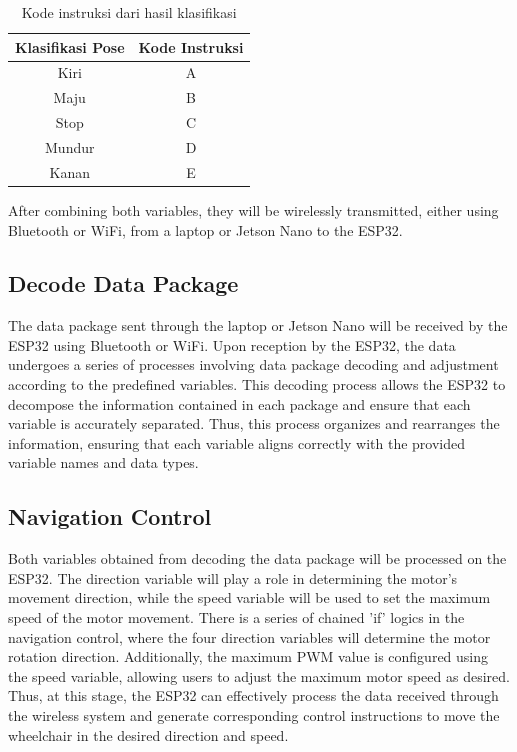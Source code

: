 \begin{table}[h]
  \centering
      \caption{Kode instruksi dari hasil klasifikasi}
      \label{tbl:kode-instruksi}
      \begin{tabular}{|c|c|}
          \hline
          Klasifikasi Pose & Kode Instruksi \\ \hline
          Kiri             & A              \\ \hline
          Maju             & B              \\ \hline
          Stop             & C              \\ \hline
          Mundur           & D              \\ \hline
          Kanan            & E              \\ \hline
      \end{tabular}
\end{table}

After combining both variables, they will be wirelessly transmitted, either using Bluetooth or WiFi, from a laptop or Jetson Nano to the ESP32.

\subsection{Decode Data Package}
The data package sent through the laptop or Jetson Nano will be received by the ESP32 using Bluetooth or WiFi. Upon reception by the ESP32, the data undergoes a series of processes involving data package decoding and adjustment according to the predefined variables. This decoding process allows the ESP32 to decompose the information contained in each package and ensure that each variable is accurately separated. Thus, this process organizes and rearranges the information, ensuring that each variable aligns correctly with the provided variable names and data types.

\subsection{Navigation Control}
Both variables obtained from decoding the data package will be processed on the ESP32. The direction variable will play a role in determining the motor's movement direction, while the speed variable will be used to set the maximum speed of the motor movement. There is a series of chained 'if' logics in the navigation control, where the four direction variables will determine the motor rotation direction. Additionally, the maximum PWM value is configured using the speed variable, allowing users to adjust the maximum motor speed as desired. Thus, at this stage, the ESP32 can effectively process the data received through the wireless system and generate corresponding control instructions to move the wheelchair in the desired direction and speed.